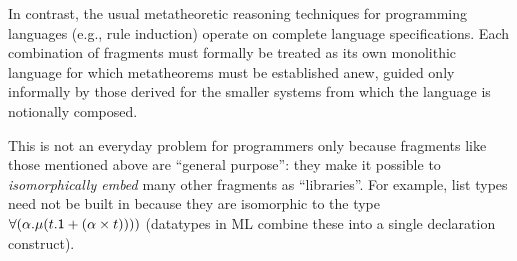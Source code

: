 \documentclass[10pt,preprint]{sigplanconf}
\begin{document}
In contrast, the usual metatheoretic reasoning techniques for programming languages  (e.g., rule induction) operate on complete language specifications. Each {combination} of fragments must formally be treated as its own monolithic language for which  metatheorems must be established anew, guided only informally by those derived for the smaller systems from which the language is notionally composed.


This is not an everyday problem for programmers only because fragments like those mentioned above are ``general purpose'': they make it possible to \emph{isomorphically embed}  many other fragments as ``libraries''. For example, list types need not be built in because they are isomorphic to the type $\forall(\alpha.\mu(t.{\sf 1} + (\alpha \times t))))$ (datatypes in ML combine these into a single declaration construct). %
\end{document}
